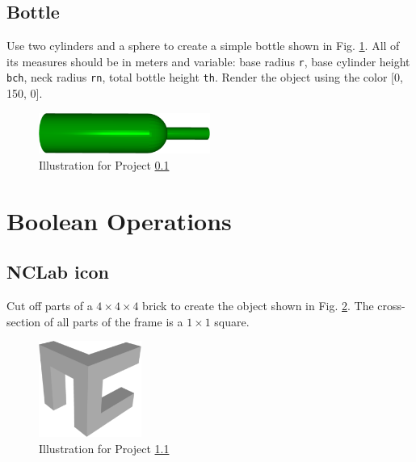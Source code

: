 \subsection{Bottle} \label{3.4}
Use two cylinders and a sphere to create a simple bottle shown in Fig. \ref{fig:b4}. 
All of its measures should be in meters and variable: base radius {\tt r}, base
cylinder height {\tt bch}, neck radius {\tt rn}, total bottle height {\tt th}.
Render the object using the color [0, 150, 0].

\begin{figure}[!ht]
\begin{center}
\includegraphics[width=0.5\textwidth]{img/bottle.png}
\end{center}
\vspace{-2mm}
\caption{Illustration for Project \ref{3.4}}
\label{fig:b4}
\end{figure}


\section{Boolean Operations}

\subsection{NCLab icon} \label{4.1}
Cut off parts of a $4 \times 4 \times 4$ brick to create the object shown in 
Fig. \ref{fig:nclabicon}. The cross-section of all parts of the frame is 
a $1 \times 1$ square.


\begin{figure}[!ht]
\begin{center}
\includegraphics[width=0.3\textwidth]{img/nclabicon.png}
\end{center}
\vspace{-2mm}
\caption{Illustration for Project \ref{4.1}}
\label{fig:nclabicon}
\end{figure}
\noindent



